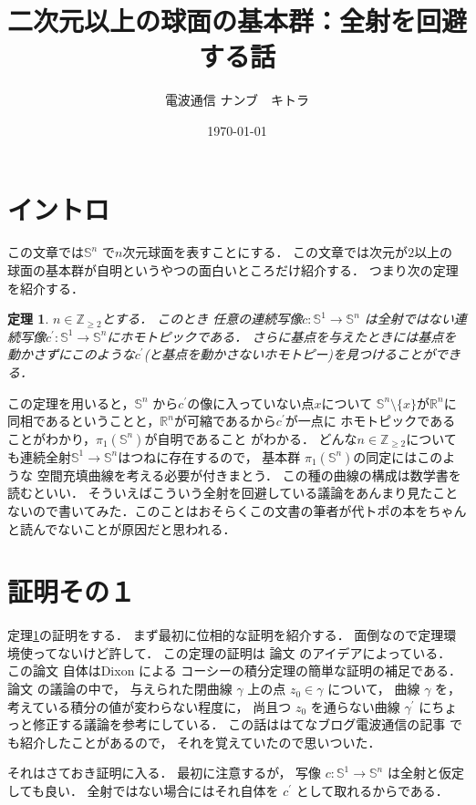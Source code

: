 \documentclass[leqno, a4paper, 12pt]{jsarticle}
\title{二次元以上の球面の基本群：全射を回避する話}
\author{電波通信 ナンブ　キトラ}
\date{\today}
\newtheorem{thm}{定理}
\newcommand{\zz}{\mathbb{Z}}
\newcommand{\rr}{\mathbb{R}}
\newcommand{\mysp}[1]{\mathbb{S}^{#1}}
\begin{document}
\maketitle

\section{イントロ}
この文章では$\mysp{n}$
で$n$次元球面を表すことにする．
この文章では次元が$2$以上の
球面の基本群が自明というやつの面白いところだけ紹介する．
つまり次の定理を紹介する．

\begin{thm}\label{thm:1}
$n\in \zz_{\ge 2}$とする．
このとき
任意の連続写像$c\colon \mysp{1}\to \mysp{n}$
は全射ではない連続写像$c^{\prime}\colon \mysp{1}\to \mysp{n}$にホモトピックである．
さらに基点を与えたときには基点を動かさずにこのような$c^{\prime}$(と基点を動かさないホモトピー)を見つけることができる．
\end{thm}
この定理を用いると，$\mysp{n}$
から$c^{\prime}$の像に入っていない点$x$について
$\mysp{n}\setminus\{x\}$が$\rr^{n}$に同相であるということと，$\rr^{n}$が可縮であるから$c^{\prime}$が一点に
ホモトピックであることがわかり，$\pi_{1}(\mysp{n})$が自明であること
がわかる．
どんな$n\in \zz_{\ge 2}$についても連続全射$\mysp{1}\to \mysp{n}$はつねに存在するので，
基本群
$\pi_{1}(\mysp{n})$の同定にはこのような
空間充填曲線を考える必要が付きまとう．
この種の曲線の構成は数学書\cite{spf}を読むといい．
そういえばこういう全射を回避している議論をあんまり見たことないので書いてみた．このことはおそらくこの文書の筆者が代トポの本をちゃんと読んでないことが原因だと思われる．



\section{証明その１}
定理\ref{thm:1}の証明をする．
まず最初に位相的な証明を紹介する．
面倒なので定理環境使ってないけど許して．
この定理の証明は
論文
\cite{Lo}
のアイデアによっている．
この論文
\cite{Lo}
自体はDixon\cite{Di}
による
コーシーの積分定理の簡単な証明の補足である．
論文
\cite{Lo}
の議論の中で，
与えられた閉曲線
$\gamma$
上の点
$z_{0}\in \gamma$
について，
曲線
$\gamma$
を，考えている積分の値が変わらない程度に，
尚且つ
$z_{0}$
を通らない曲線
$\gamma^{\prime}$
にちょっと修正する議論を参考にしている．
この話ははてなブログ電波通信の記事
\cite{Den1}
でも紹介したことがあるので，
それを覚えていたので思いついた．

それはさておき証明に入る．
最初に注意するが，
写像
$c\colon \mysp{1}\to \mysp{n}$
は全射と仮定しても良い．
全射ではない場合にはそれ自体を
$c^{\prime}$
として取れるからである．
\end{document}
